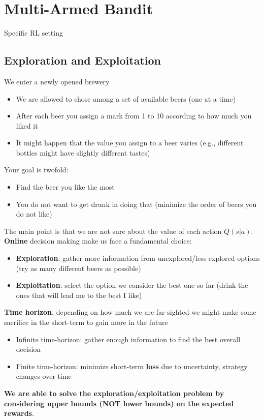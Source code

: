 
\section{Multi-Armed Bandit}
Specific RL setting
\subsection{Exploration and Exploitation}
We enter a newly opened brewery
\begin{itemize}
    \item We are allowed to chose among a set of available beers (one at a time)
    \item After each beer you assign a mark from 1 to 10 according to how much you liked it
    \item It might happen that the value you assign to a beer varies (e.g., different bottles might have slightly different tastes)
\end{itemize}
Your goal is twofold:
\begin{itemize}
    \item Find the beer you like the most
    \item You do not want to get drunk in doing that (minimize the order of beers you do not like)
\end{itemize}
The main point is that we are not sure about the value of each action $Q(s|a)$. \textbf{Online} decision making make us face a fundamental choice:
\begin{itemize}
    \item \textbf{Exploration}: gather more information from unexplored/less explored options (try as many different beers as possible)
    \item \textbf{Exploitation}: select the option we consider the best one so far (drink the ones that will lead me to the best I like)
\end{itemize}
\textbf{Time horizon}, depending on how much we are far-sighted we might make some sacrifice in the short-term to gain more in the future
\begin{itemize}
    \item Infinite time-horizon: gather enough information to find the best overall decision
    \item Finite time-horizon: minimize short-term \textbf{loss} due to uncertainty, strategy changes over time
\end{itemize}
\textbf{We are able to solve the exploration/exploitation problem by considering upper bounds (NOT lower bounds) on the expected rewards}.

